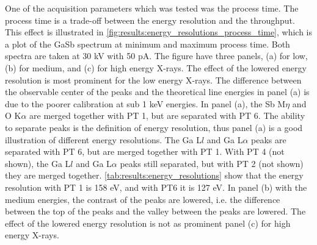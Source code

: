One of the acquisition parameters which was tested was the process time.
The process time is a trade-off between the energy resolution and the throughput.
This effect is illustrated in \cref{fig:results:energy_resolutions_process_time}, which is a plot of the GaSb spectrum at minimum and maximum process time.
Both spectra are taken at 30 kV with 50 pA.
The figure have three panels, (a) for low, (b) for medium, and (c) for high energy X-rays.
The effect of the lowered energy resolution is most prominent for the low energy X-rays.
The difference between the observable center of the peaks and the theoretical line energies in panel (a) is due to the poorer calibration at sub 1 keV energies.
In panel (a), the Sb M$\eta$ and O K$\alpha$ are merged together with PT 1, but are separated with PT 6.
The ability to separate peaks is the definition of energy resolution, thus panel (a) is a good illustration of different energy resolutions.
The Ga L$l$ and Ga L$\alpha$ peaks are separated with PT 6, but are merged together with PT 1.
With PT 4 (not shown), the Ga L$l$ and Ga L$\alpha$ peaks still separated, but with PT 2 (not shown) they are merged together.
\cref{tab:results:energy_resolutions} show that the energy resolution with PT 1 is 158 eV, and with PT6 it is 127 eV.
In panel (b) with the medium energies, the contrast of the peaks are lowered, i.e. the difference between the top of the peaks and the valley between the peaks are lowered.
The effect of the lowered energy resolution is not as prominent panel (c) for high energy X-rays.



